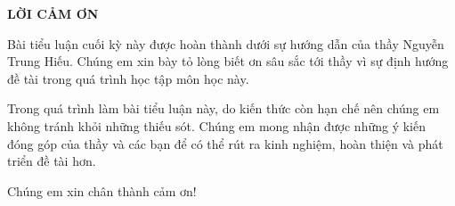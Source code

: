 \documentclass[fontsize=12pt,a4paper,oneside,DIV=calc,chapterprefix=true]{scrbook}
\theoremstyle{plain}
\theoremstyle{definition}
\theoremstyle{remark}
\begin{document}
\setcounter{secnumdepth}{4}





\clearpage
\thispagestyle{empty} %

\vspace*{\fill} %
{\centering \LARGE \textbf{LỜI CẢM ƠN} \par}
\vspace{2em}
Bài tiểu luận cuối kỳ này được hoàn thành dưới sự hướng dẫn của thầy Nguyễn Trung Hiếu. Chúng em xin bày tỏ lòng biết ơn sâu sắc tới thầy vì sự định hướng đề tài trong quá trình học tập môn học này.

Trong quá trình làm bài tiểu luận này, do kiến thức còn hạn chế nên chúng em không tránh khỏi những thiếu sót. Chúng em mong nhận được những ý kiến đóng góp của thầy và các bạn để có thể rút ra kinh nghiệm, hoàn thiện và phát triển đề tài hơn.

Chúng em xin chân thành cảm ơn!
\vspace{5cm}
\vspace*{\fill} %


\clearpage %
\tableofcontents

\fancyhead{}  %
\renewcommand{\footrulewidth}{0.4pt}

\pagestyle{fancy}









% 


\nocite{*}


\end{document}
